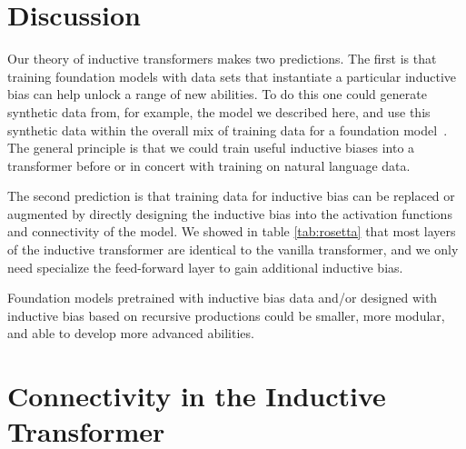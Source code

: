 \documentclass{article}
\begin{document}
\section{Discussion}

Our theory of inductive transformers makes two predictions.  The first is that training foundation models with data sets that instantiate a particular inductive bias can help unlock a range of new abilities.  To do this one could generate synthetic data from, for example, the model we described here, and use this synthetic data within the overall mix of training data for a foundation model~\citep{akyurek2020learning}. The general principle is that we could train useful inductive biases into a transformer before or in concert with training on natural language data.  

The second prediction is that training data for inductive bias can be replaced or augmented by directly designing the inductive bias into the activation functions and connectivity of the model.  We showed in table \ref{tab:rosetta} that most layers of the inductive transformer are identical to the vanilla transformer, and we only need specialize the feed-forward layer to gain additional inductive bias.

Foundation models pretrained with inductive bias data and/or designed with inductive bias based on recursive productions could be smaller, more modular, and able to develop more advanced abilities.  




\newpage



\newpage
\appendix



\section{Connectivity in the Inductive Transformer}\label{appendix:connectivity}
\end{document}
